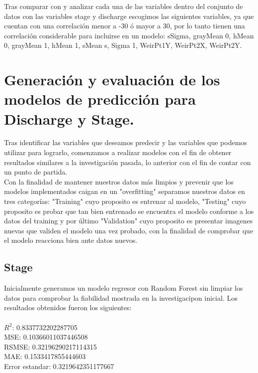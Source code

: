 \documentclass{article}
\begin{document}
        Tras comparar con y analizar cada una de las variables dentro del conjunto de datos con las variables stage y discharge escogimos las siguientes variables, ya que cuentan con una correlación menor a -30 ó mayor a 30, por lo tanto tienen una correlación considerable para incluirse en un modelo: sSigma, grayMean 0, hMean 0, grayMean 1, hMean 1, sMean s, Sigma 1, WeirPt1Y, WeirPt2X, WeirPt2Y. 




\section{Generación y evaluación de los modelos de predicción para Discharge y Stage.}
Tras identificar las variables que deseamos predecir y las variables que podemos utilizar para lograrlo, comenzamos a realizar modelos con el fin de obtener resultados similares a la investigación pasada, lo anterior con el fin de contar con un punto de partida. \\

Con la finalidad de mantener nuestros datos más limpios y prevenir que los modelos implementados caigan en un "overfitting" separamos nuestros datos en tres categorías: "Training" cuyo proposito es entrenar al modelo, "Testing" cuyo proposito es probar que tan bien entrenado se encuentra el modelo conforme a los datos del training y por último "Validation" cuyo proposito es presentar imagenes nuevas que validen el modelo una vez probado, con la finalidad de comprobar que el modelo reacciona bien ante datos nuevos. 

    

    \subsection{Stage}

        Inicialmente generamos un modelo regresor con Random Forest sin limpiar los datos para comprobar la fiabilidad mostrada en la investigacipon inicial. Los resultados obtenidos fueron los siguientes:\\
        \\
        $R^{2}$:  0.8337732202287705 \\
        MSE:  0.10366011037446508 \\
        RSMSE:  0.32196290217114315\\
        MAE:  0.1533417855444603\\
        Error estandar:  0.3219642351177667\\
    
\end{document}
